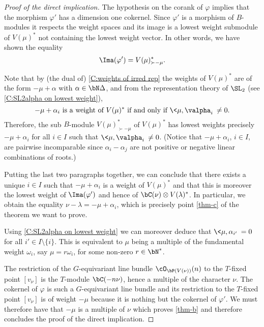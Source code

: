 \documentclass[reqno, 10pt]{amsart}
\theoremstyle{plain}
\theoremstyle{definition}
\numberwithin{equation}{section}%
\begin{document}
\begin{proof}[Proof of the direct implication]
	The hypothesis on the corank of $\varphi$ implies that the morphism $\varphi'$ has a dimension one cokernel.
	Since $\varphi'$ is a morphism of $B$-modules it respects the weight spaces and its image is a lowest weight submodule of $V(\mu)^*$ not containing the lowest weight vector.
	In other words, we have shown the equality
	\begin{align}\label{e:image varphi'}
	\Ima(\varphi') = V(\mu)^*_{\succ -\mu}.
	\end{align} 

	Note that by (the dual of) \cref{C:weights of irred rep} the weights of $V(\mu)^*$ are of the form $-\mu+\alpha$ with $\alpha\in\bN\Delta$, and
	from the representation theory of $\SL_2$ (see \cref{C:SL2alpha on lowest weight}), 
	\begin{equation}\label{e:weights of Vmu*}
		-\mu+\alpha_i \text{ is a weight of } V(\mu)^* \text{ if and only if } \<\mu,\valpha_i\>\neq 0. 
	\end{equation}
	Therefore, the sub $B$-module $V(\mu)^*_{\succ -\mu}$ of $V(\mu)^*$ has lowest weights precisely $-\mu+\alpha_i$ for all $i\in I$ such that $\<\mu,\valpha_i\>\neq 0$. (Notice that $-\mu+\alpha_i$, $i\in I$, are pairwise incomparable since $\alpha_i-\alpha_j$ are not positive or negative linear combinations of roots.)
  


	Putting the last two paragraphs together, we can conclude that there exists a unique $i\in I$ such that $-\mu+\alpha_i$ is a weight of $V(\mu)^*$ and that this is moreover the lowest weight of $\Ima(\varphi')$ and hence of $\bC(\nu)\otimes V(\lambda)^*$.
	In particular, we obtain the equality $\nu-\lambda = -\mu+\alpha_i$, which is precisely point \ref{thm-c} of the theorem we want to prove.
	
	Using \cref{C:SL2alpha on lowest weight} we can moreover deduce that $\<\mu,\alpha_{i'}\>=0$ for all $i'\in I\setminus\{i\}$.
	This is equivalent to $\mu$ being a multiple of the fundamental
        weight $\omega_i$, say $\mu = r\omega_i$, for some non-zero
        $r\in\bN^*$.
	
	The restriction of the $G$-equivariant line bundle $\cO_{\bP(V(\nu))}(n)$ to the $T$-fixed point $[v_\nu]$ is the $T$-module $\bC(-n\nu)$, hence a multiple of the character $\nu$.
	The cokernel of $\varphi$ is such a $G$-equivariant line bundle and its restriction to the $T$-fixed point $[v_\nu]$ is of weight $-\mu$ because it is nothing but the cokernel of $\varphi'$.
	We must therefore have that $-\mu$ is a multiple of $\nu$ which proves \ref{thm-b} and therefore concludes the proof of the direct implication. 
\end{proof}
\end{document}
